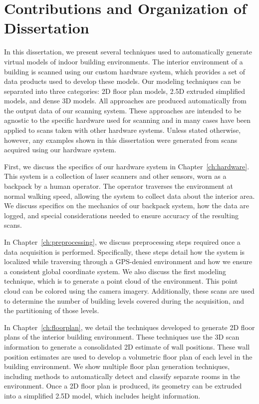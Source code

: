 \documentclass[12pt,onecolumn,oneside]{book}
\begin{document}
\section{Contributions and Organization of Dissertation}
\label{sec:organization}

In this dissertation, we present several techniques used to automatically generate virtual models of indoor building environments.  The interior environment of a building is scanned using our custom hardware system, which provides a set of data products used to develop these models.  Our modeling techniques can be separated into three categories:  2D floor plan models, 2.5D extruded simplified models, and dense 3D models.  All approaches are produced automatically from the output data of our scanning system.  These approaches are intended to be agnostic to the specific hardware used for scanning and in many cases have been applied to scans taken with other hardware systems.  Unless stated otherwise, however, any examples shown in this dissertation were generated from scans acquired using our hardware system.

First, we discuss the specifics of our hardware system in Chapter~\ref{ch:hardware}.  This system is a collection of laser scanners and other sensors, worn as a backpack by a human operator.  The operator traverses the environment at normal walking speed, allowing the system to collect data about the interior area.  We discuss specifics on the mechanics of our backpack system, how the data are logged, and special considerations needed to ensure accuracy of the resulting scans.

In Chapter~\ref{ch:preprocessing}, we discuss preprocessing steps required once a data acquisition is performed.  Specifically, these steps detail how the system is localized while traversing through a GPS-denied environment and how we ensure a consistent global coordinate system.  We also discuss the first modeling technique, which is to generate a point cloud of the environment.  This point cloud can be colored using the camera imagery.  Additionally, these scans are used to determine the number of building levels covered during the acquisition, and the partitioning of those levels.

In Chapter~\ref{ch:floorplan}, we detail the techniques developed to generate 2D floor plans of the interior building environment.  These techniques use the 3D scan information to generate a consolidated 2D estimate of wall positions.  These wall position estimates are used to develop a volumetric floor plan of each level in the building environment.  We show multiple floor plan generation techniques, including methods to automatically detect and classify separate rooms in the environment.  Once a 2D floor plan is produced, its geometry can be extruded into a simplified 2.5D model, which includes height information.
\end{document}
